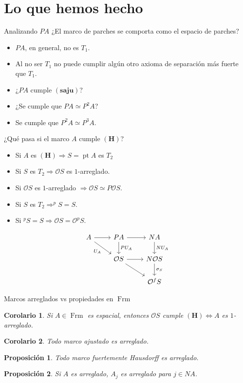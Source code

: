 \documentclass[compress,12pt]{beamer}
\DeclareMathOperator{\pt}{pt}
\DeclareMathOperator{\Frm}{Frm}
\newtheorem{cor}{Corolario}
\newtheorem{prop}{Proposición}
\begin{document}
\section{Lo que hemos hecho}
\begin{frame}{Analizando $PA$}
¿El marco de parches se comporta como el espacio de parches?
\begin{itemize}
	\item $PA$, en general, no es  $T_1$.
	\item Al no ser $T_1$ no puede cumplir algún otro axioma de separación más fuerte que $T_1$.
	\item ¿$PA$ cumple $\mathbf{(saju)}$?
	\item ¿Se cumple que $PA\simeq P^2A$?
	\item Se cumple que $P^2A\simeq P^3A$.
\end{itemize}
¿Qué pasa si el marco $A$ cumple $\mathbf{(H)}$?
\end{frame}

\begin{frame}[fragile]
\begin{itemize}
\item Si $A$ es $\mathbf{(H)}\Rightarrow S=\pt A$ es $T_2$
\item Si $S$ es $T_2\Rightarrow \mathcal{O}S$ es $1$-arreglado.
\item Si $\mathcal{O}S$ es $1$-arreglado $\Rightarrow \mathcal{O}S\simeq P\mathcal{O}S$.
\item Si $S$ es $T_2\Rightarrow ^pS=S$.
\item Si $^pS=S\Rightarrow \mathcal{O}S=\mathcal{O}^pS$.
\end{itemize}
\[\begin{tikzcd}
	A & PA & NA \\
	& {\mathcal{O}S} & {N\mathcal{O}S} \\
	&& {\mathcal{O}^fS}
	\arrow[from=1-1, to=1-2]
	\arrow["{U_A}"', from=1-1, to=2-2]
	\arrow[from=1-2, to=1-3]
	\arrow["{PU_A}", from=1-2, to=2-2]
	\arrow["{NU_A}", from=1-3, to=2-3]
	\arrow[from=2-2, to=2-3]
	\arrow[from=2-2, to=3-3]
	\arrow["{\sigma_S}", from=2-3, to=3-3]
\end{tikzcd}\]
\end{frame}

\begin{frame}{Marcos arreglados vs propiedades en $\Frm$}
\begin{cor}
Si $A\in \Frm$ es espacial, entonces $\mathcal{O}S$ cumple $\mathbf{(H)}\Leftrightarrow A$ es $1$-arreglado.
\end{cor}

\begin{cor}
	Todo marco ajustado es arreglado.
\end{cor}

\begin{prop}
Todo marco fuertemente Hausdorff es arreglado.
\end{prop}

\begin{prop}
Si $A$ es arreglado, $A_j$ es arreglado para $j\in NA$.
\end{prop}

\end{frame}
\end{document}
